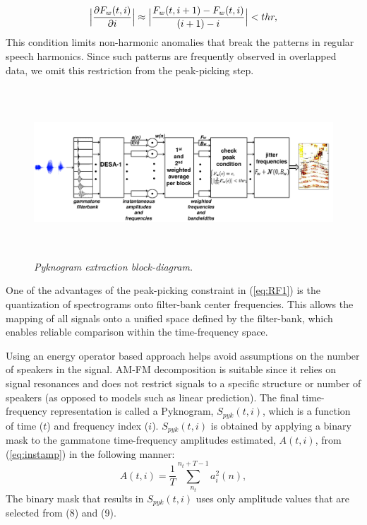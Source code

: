 {\begin{equation}
\label{eq:RF2}
\Big|\frac{\partial F_w(t,i)}{\partial i} \Big| \approx \Big|\frac{F_w(t,i+1) - F_w(t,i)}{(i+1) - i}\Big| < thr, 
\vspace{1mm}
\end{equation}
This condition limits non-harmonic anomalies that break the patterns in regular speech harmonics. 
Since such patterns are frequently observed in overlapped data, we omit this restriction from the peak-picking step.  

\begin{figure}[h!]
	\centering
	\vspace{0mm}
	\includegraphics[height = 2.5in, width=1\textwidth]{figures/pyknogram_blockdiagram}
	\vspace{-3mm}
	\caption{\it Pyknogram extraction block-diagram.}
	\label{fig:pykno_blockdiag}
	\vspace{-3mm}
\end{figure}


One of the advantages of the peak-picking constraint in (\ref{eq:RF1}) is the quantization of spectrograms onto filter-bank center frequencies. 
This allows the mapping of all signals onto a unified space defined by the filter-bank, which enables reliable comparison within the time-frequency space. 

Using an energy operator based approach helps avoid assumptions on the number of speakers in the signal. 
AM-FM decomposition is suitable since it relies on signal resonances and does not restrict signals to a specific structure or number of speakers (as opposed to models such as linear prediction). 
The final time-frequency representation is called a Pyknogram, $S_{pyk}(t,i)$, which is a function of time ($t$) and frequency index ($i$). 
$S_{pyk}(t,i)$ is obtained by applying a binary mask to the gammatone time-frequency amplitudes estimated, $A(t,i)$, from (\ref{eq:instamp}) in the following manner:
\begin{equation}
\label{eq:amplitude_spectrum}
A(t,i) = \frac{1}{T}\sum_{n_t}^{n_t+T - 1}a_i^2(n),
\end{equation}
The binary mask that results in $S_{pyk}(t,i)$ uses only amplitude values that are selected from (8) and (9). 


}
